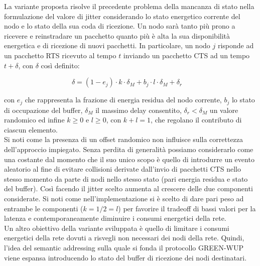 \documentclass[binding=0.6cm,TFA]{sapthesis}
\begin{document}
La variante proposta risolve il precedente problema della mancanza di stato nella formulazione del valore di jitter considerando lo stato energetico
corrente del nodo e lo stato della sua coda di ricezione. Un nodo sarà tanto più prono a ricevere e reinstradare un pacchetto quanto
più è alta la sua disponibilità energetica e di ricezione di nuovi pacchetti. In particolare, un nodo $j$ risponde ad un pacchetto RTS ricevuto al
tempo $t$ inviando un pacchetto CTS ad un tempo $t+\delta$, con $\delta$ così definito:

\begin{equation}
    \delta= (1-e_{j}) \cdot k \cdot \delta_{M} + b_{j} \cdot l \cdot \delta_{M} + \delta_{r} \quad
\end{equation}

con $e_{j}$ che rappresenta la frazione di energia residua del nodo corrente, $b_{j}$ lo stato di occupazione del buffer, $\delta_{M}$ il massimo
delay consentito, $\delta_{r} < \delta_{M}$ un valore randomico ed infine $k \geq 0$ e $l \geq 0$, con $k+l=1$, che regolano il contributo di
ciascun elemento.\\

Si noti come la presenza di un offset randomico non influisce sulla correttezza dell'approccio impiegato. Senza perdita di generalità possiamo considerarlo come una
costante dal momento che il suo unico scopo è quello di introdurre un evento aleatorio al fine di evitare collisioni derivate dall'invio di pacchetti CTS
nello stesso momento da parte di nodi nello stesso stato (pari energia residua e stato del buffer). Così facendo il jitter scelto aumenta al crescere
delle due componenti considerate. Si noti come nell'implementazione si è scelto di dare pari peso ad entrambe le componenti ($k=1/2=l$) per favorire il
tradeoff di bassi valori per la latenza e contemporaneamente diminuire i consumi energetici della rete.\\

Un altro obiettivo della variante sviluppata è quello di limitare i consumi energetici della rete dovuti a risvegli non necessari dei nodi della rete. Quindi,
l'idea del semantic addressing sulla quale si fonda il protocollo GREEN-WUP viene espansa introducendo lo stato del buffer di ricezione dei nodi destinatari.\\
\end{document}
